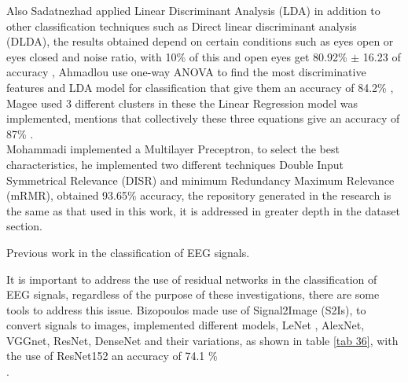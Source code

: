 \documentclass[letterpaper,12pt,openright,oneside]{article}
\begin{document}
Also Sadatnezhad applied Linear Discriminant Analysis (LDA) in addition to other classification techniques such as Direct linear discriminant analysis (DLDA), the results obtained depend on certain conditions such as eyes open or eyes closed and noise ratio, with 10\% of this and open eyes get 80.92\% $\pm$ 16.23 of accuracy \cite{SADATNEZHAD}, Ahmadlou use one-way ANOVA to find the most discriminative features and LDA model  for classification that give them  an accuracy of 84.2\% \cite{AHMADLOU}, Magee used 3 different clusters in these  the Linear Regression model was implemented,  mentions that collectively these three equations give an accuracy of 87\% \cite{MAGEE}.\\

Mohammadi implemented a Multilayer Preceptron, to select the best characteristics, he implemented two different techniques Double Input Symmetrical Relevance (DISR) and minimum Redundancy Maximum Relevance (mRMR), obtained 93.65\% accuracy\cite{Xarticle}, the repository generated in the research is the same as that used in this work, it is addressed in greater depth in the dataset section.





\begin{table}[H]
\centerline{}
\caption{Previous work in the classification of EEG signals.}
\label{tab1}
\end{table}


It is important to address the use of residual networks in the classification of EEG signals, regardless of the purpose of these investigations, there are some tools to address this issue. Bizopoulos made use of Signal2Image (S2Is), to convert signals to images, implemented different models, LeNet , AlexNet, VGGnet, ResNet, DenseNet and their variations, as shown in table \ref{tab 36}, with the use of ResNet152 an accuracy of 74.1 \% \cite{Bizopu} \\.
\end{document}

